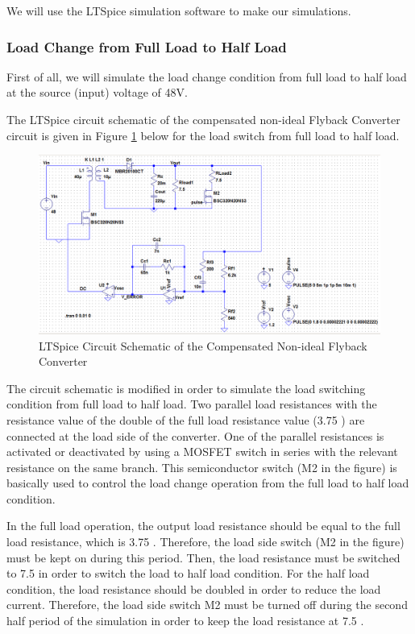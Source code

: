 We will use the LTSpice simulation software to make our simulations.

\subsubsection{Load Change from Full Load to Half Load}

First of all, we will simulate the load change condition from full load to half load at the source (input) voltage of 48V.

The LTSpice circuit schematic of the compensated non-ideal Flyback Converter circuit is given in Figure \ref{com:schematic_FH} below for the load switch from full load to half load.

\begin{figure}[H]
\begin{center}
\includegraphics[width=1\textwidth]{comp_simulations/schematic_FH.png}
\caption{LTSpice Circuit Schematic of the Compensated Non-ideal Flyback Converter}
\label{com:schematic_FH}
\end{center}
\end{figure}

The circuit schematic is modified in order to simulate the load switching condition from full load to half load. Two parallel load resistances with the resistance value of the double of the full load resistance value (3.75 \ohm) are connected at the load side of the converter. One of the parallel resistances is activated or deactivated by using a MOSFET switch in series with the relevant resistance on the same branch. This semiconductor switch (M2 in the figure) is basically used to control the load change operation from the full load to half load condition.

In the full load operation, the output load resistance should be equal to the full load resistance, which is 3.75 \ohm. Therefore, the load side switch (M2 in the figure) must be kept on during this period. Then, the load resistance must be switched to 7.5 \ohm in order to switch the load to half load condition. For the half load condition, the load resistance should be doubled in order to reduce the load current. Therefore, the load side switch M2 must be turned off during the second half period of the simulation in order to keep the load resistance at 7.5 \ohm.

